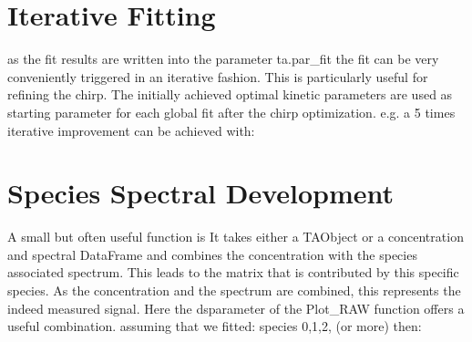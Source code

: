 \documentclass[letterpaper,10pt,english]{sphinxmanual}
\begin{document}
\section{Iterative Fitting}
\label{\detokenize{Fitting:iterative-fitting}}
as the fit results are written into the parameter ta.par\_fit the fit can be very conveniently
triggered in an iterative fashion. This is particularly useful for refining the chirp.
The initially achieved optimal kinetic parameters are used as starting parameter for each
global fit after the chirp optimization. e.g. a 5 times iterative improvement can be achieved with:

\begin{sphinxVerbatim}[commandchars=\\\{\}]
   
        \PYG{p}{[}\PYG{p}{]}
          \PYG{p}{[}\PYG{p}{]}  
\end{sphinxVerbatim}


\section{Species Spectral Development}
\label{\detokenize{Fitting:species-spectral-development}}
A small but often useful function is {\hyperref[\detokenize{plot_func:plot_func.Species_Spectra}]{}} It takes either a TA\sphinxhyphen{}Object or a concentration and spectral DataFrame and combines the concentration with the species associated spectrum. This leads to the matrix that is contributed by this specific species. As the concentration and the spectrum are combined, this represents the indeed measured signal. Here the ds\sphinxhyphen{}parameter of the Plot\_RAW function offers a useful combination. assuming that we fitted: species 0,1,2, (or more) then:

\begin{sphinxVerbatim}[commandchars=\\\{\}]
\PYG{p}{[}\PYG{p}{]}\PYG{p}{[}\PYG{p}{]}\PYG{p}{[}\PYG{p}{]}
\end{sphinxVerbatim}
\end{document}
